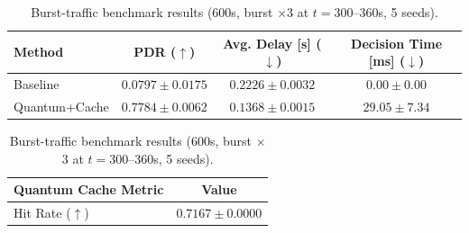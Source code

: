 \begin{table}[t]
\centering
\caption{Burst-traffic benchmark results (600s, burst $\times$3 at $t=300\text{--}360$s, 5 seeds).}
\label{tab:burst-main}
\begin{tabular}{lccc}
\hline
Method & PDR ($\uparrow$) & Avg. Delay [s] ($\downarrow$) & Decision Time [ms] ($\downarrow$) \\
\hline
Baseline & $0.0797 \pm 0.0175$ & $0.2226 \pm 0.0032$ & $0.00 \pm 0.00$ \\
Quantum+Cache & $0.7784 \pm 0.0062$ & $0.1368 \pm 0.0015$ & $29.05 \pm 7.34$ \\
\hline
\end{tabular}
\vspace{2mm}

\begin{tabular}{lc}
\hline
Quantum Cache Metric & Value \\
\hline
Hit Rate ($\uparrow$) & $0.7167 \pm 0.0000$ \\
\hline
\end{tabular}
\end{table}
